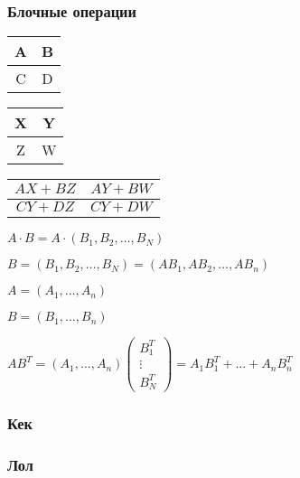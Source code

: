 \subsubsection{Блочные операции}

\begin{tabular}{|c|c|}
    \hline
    A & B \\
    \hline
    C & D \\
    \hline
\end{tabular}

\begin{tabular}{|c|c|}
    \hline
    X & Y \\
    \hline
    Z & W \\
    \hline
\end{tabular}

\begin{tabular}{|c|c|}
    \hline
    $AX + BZ$ & $AY + BW$ \\
    \hline
    $CY + DZ$ & $CY + DW$ \\
    \hline
\end{tabular}


$A \cdot B = A \cdot (B_1, B_2, \dots, B_N) $

$B = (B_1, B_2, \dots, B_N) = (AB_1, AB_2, \dots, AB_n)$


$A = (A_1, \dots, A_n)$

$B = (B_1, \dots, B_n)$

$AB^T = (A_1, \dots, A_n) \begin{pmatrix} B_1^T \\ \vdots \\ B_N^T \end{pmatrix} = A_1 B_1^T + \dots + A_n B_n^T$

\subsubsection{Кек}





\subsubsection{Лол}

